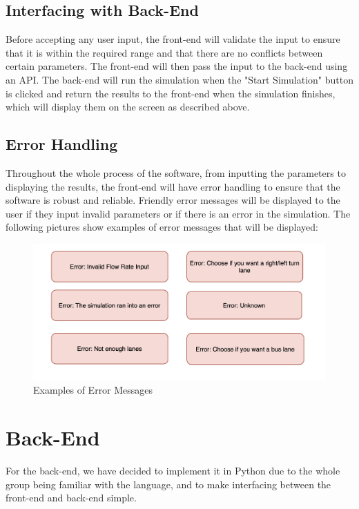 \documentclass{article}
\begin{document}
\subsection{Interfacing with Back-End}
Before accepting any user input, the front-end will validate the input to ensure that it is within the required range and that there are no conflicts between certain parameters.
The front-end will then pass the input to the back-end using an API. The back-end will run the simulation when the "Start Simulation" button is clicked and return the results to the front-end when the simulation finishes,
which will display them on the screen as described above.

\subsection{Error Handling}
Throughout the whole process of the software, from inputting the parameters to displaying the results, the front-end will have error handling to ensure that the software is robust and reliable.
Friendly error messages will be displayed to the user if they input invalid parameters or if there is an error in the simulation. The following pictures show examples of error messages that will be displayed:

\begin{figure}[H]
    \centering
    \includegraphics[width=\textwidth]{errormsg.png}
    \caption{Examples of Error Messages}
    \label{errormsg}
\end{figure}

\section{Back-End}
For the back-end, we have decided to implement it in Python due to the whole group being familiar with the language, and to make 
interfacing between the front-end and back-end simple. 
\end{document}
